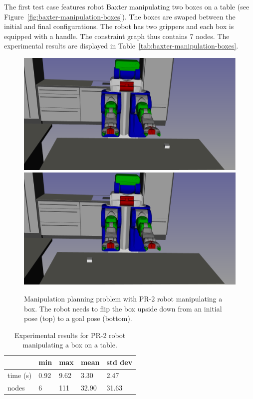 The first test case features robot Baxter manipulating two boxes on a table (see Figure~\ref{fig:baxter-manipulation-boxes}). The boxes are swaped between the initial and final configurations. The robot has two grippers and each box is equipped with a handle. The constraint graph thus contains 7 nodes. The experimental results are displayed in Table~\ref{tab:baxter-manipulation-boxes}.

\begin{figure}
  \begin{center}
    \includegraphics[width=\linewidth]{figures/pr2-manipulation-two-hands-init.png}
    \includegraphics[width=\linewidth]{figures/pr2-manipulation-two-hands-goal.png}    
  \end{center}
  \caption{Manipulation planning problem with PR-2 robot manipulating a box. The robot needs to flip the box upside down from an initial pose (top) to a goal pose (bottom).}
  \label{fig:pr2-manipulation-two-hands}
\end{figure}

\begin{table}
  \begin{center}
  \begin{tabular}{|l|l|l|l|l|}
    \hline
    & min & max & mean & std dev \\
    \hline
    time (s) & 0.92 & 9.62 & 3.30 & 2.47 \\
    nodes & 6 &  111 & 32.90 & 31.63 \\
    \hline
  \end{tabular}
  \end{center}
  \caption{Experimental results for PR-2 robot manipulating a box on a table.}
  \label{tab:pr2-manipulation-two-hands}
\end{table}

